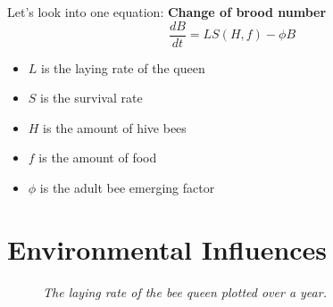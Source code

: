 \documentclass[
paper=128mm:96mm, %
fontsize=11pt, %
pagesize, %
parskip=half-, %
]{scrartcl} %
\theoremstyle{mythmstyle} %
\begin{document}
\clearpage


Let's look into one equation: \textbf{Change of brood number}
\begin{equation}\label{eq:changeBroodNumbers}
		\frac{dB}{dt} = LS(H,f)-\phi B
\end{equation}
\begin{itemize}
\item $L$ is the laying rate of the queen
\item $S$ is the survival rate
\item $H$ is the amount of hive bees
\item $f$ is the amount of food
\item $\phi$ is the adult bee emerging factor
\end{itemize}

\clearpage



\section{Environmental Influences}
\begin{figure}[H]
			\centering
			\caption{\textit{The laying rate of the bee queen plotted over a year.}}
\end{figure}
	
\end{document}
